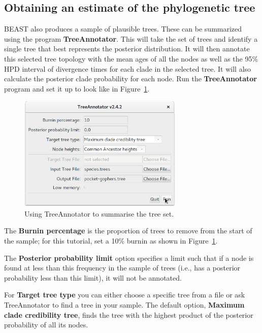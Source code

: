 \documentclass{article}
\begin{document}
\subsection*{Obtaining an estimate of the phylogenetic tree}

BEAST also produces a sample of plausible trees. These can be summarized using
the program \textbf{TreeAnnotator}. This will take the set of trees and identify
a single tree that best represents the posterior distribution. It will then
annotate this selected tree topology with the mean ages of all the nodes as well
as the 95\% HPD interval of divergence times for each clade in the selected
tree. It will also calculate the posterior clade probability for each node. Run
the \textbf{TreeAnnotator} program and set it up to look like in
Figure~\ref{fig:treeannotator}.

\begin{figure}[htb!]
\centering
\includegraphics[width=0.7\textwidth]{figures/treeannotator.png}
\caption{Using TreeAnnotator to summarise the tree set.}
\label{fig:treeannotator}
\end{figure}

The \textbf{Burnin percentage} is the proportion of trees to remove from the
start of the sample; for this tutorial, set a 10\% burnin as shown in
Figure~\ref{fig:treeannotator}.

The \textbf{Posterior probability limit} option specifies a limit such that if a
node is found at less than this frequency in the sample of trees (i.e., has a
posterior probability less than this limit), it will not be annotated.

For \textbf{Target tree type} you can either choose a specific tree from a file
or ask TreeAnnotator to find a tree in your sample. The default option,
\textbf{Maximum clade credibility tree}, finds the tree with the highest product
of the posterior probability of all its nodes.
\end{document}
